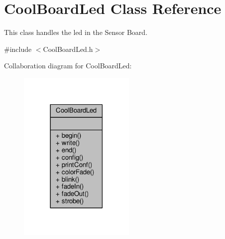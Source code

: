 \hypertarget{class_cool_board_led}{}\section{Cool\+Board\+Led Class Reference}
\label{class_cool_board_led}


This class handles the led in the Sensor Board.  




{\ttfamily \#include $<$Cool\+Board\+Led.\+h$>$}



Collaboration diagram for Cool\+Board\+Led\+:
\nopagebreak
\begin{figure}[H]
\begin{center}
\leavevmode
\includegraphics[width=158pt]{d4/d22/class_cool_board_led__coll__graph}
\end{center}
\end{figure}
